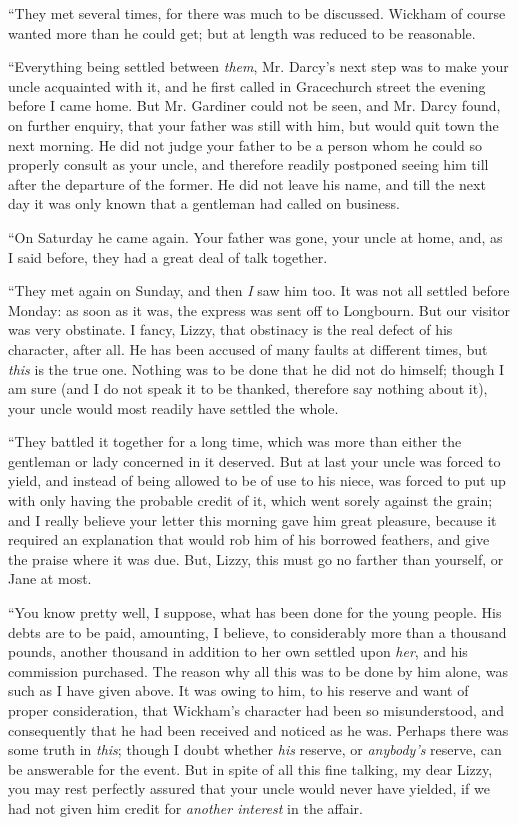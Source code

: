 “They met several times, for there was much to be discussed. Wickham of course wanted more than he could get; but at length was reduced to be reasonable.

“Everything being settled between {\em them}, Mr. Darcy's next step was to make your uncle acquainted with it, and he first called in Gracechurch street the evening before I came home. But Mr. Gardiner could not be seen, and Mr. Darcy found, on further enquiry, that your father was still with him, but would quit town the next morning. He did not judge your father to be a person whom he could so properly consult as your uncle, and therefore readily postponed seeing him till after the departure of the former. He did not leave his name, and till the next day it was only known that a gentleman had called on business.

“On Saturday he came again. Your father was gone, your uncle at home, and, as I said before, they had a great deal of talk together.

“They met again on Sunday, and then {\em I} saw him too. It was not all settled before Monday: as soon as it was, the express was sent off to Longbourn. But our visitor was very obstinate. I fancy, Lizzy, that obstinacy is the real defect of his character, after all. He has been accused of many faults at different times, but {\em this} is the true one. Nothing was to be done that he did not do himself; though I am sure (and I do not speak it to be thanked, therefore say nothing about it), your uncle would most readily have settled the whole.

“They battled it together for a long time, which was more than either the gentleman or lady concerned in it deserved. But at last your uncle was forced to yield, and instead of being allowed to be of use to his niece, was forced to put up with only having the probable credit of it, which went sorely against the grain; and I really believe your letter this morning gave him great pleasure, because it required an explanation that would rob him of his borrowed feathers, and give the praise where it was due. But, Lizzy, this must go no farther than yourself, or Jane at most.

“You know pretty well, I suppose, what has been done for the young people. His debts are to be paid, amounting, I believe, to considerably more than a thousand pounds, another thousand in addition to her own settled upon {\em her}, and his commission purchased. The reason why all this was to be done by him alone, was such as I have given above. It was owing to him, to his reserve and want of proper consideration, that Wickham's character had been so misunderstood, and consequently that he had been received and noticed as he was. Perhaps there was some truth in {\em this}; though I doubt whether {\em his} reserve, or {\em anybody's} reserve, can be answerable for the event. But in spite of all this fine talking, my dear Lizzy, you may rest perfectly assured that your uncle would never have yielded, if we had not given him credit for {\em another interest} in the affair.

